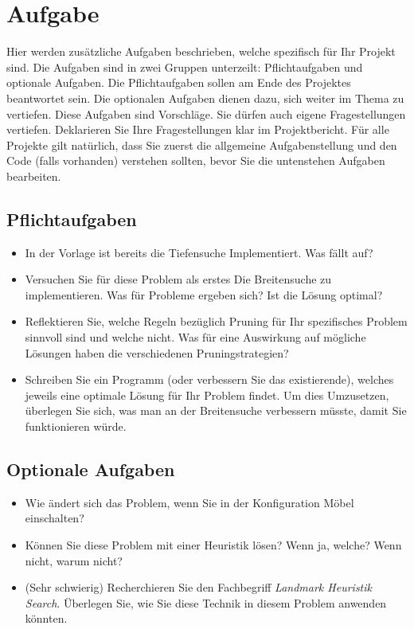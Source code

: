 \documentclass[a4paper,11pt,german,notitlepage]{report}
\begin{document}
\section*{Aufgabe}
Hier werden zusätzliche Aufgaben beschrieben, welche spezifisch für Ihr Projekt sind.
Die Aufgaben sind in zwei Gruppen unterzeilt: Pflichtaufgaben und optionale Aufgaben.
Die Pflichtaufgaben sollen am Ende des Projektes beantwortet sein.
Die optionalen Aufgaben dienen dazu, sich weiter im Thema zu vertiefen.
Diese Aufgaben sind Vorschläge. Sie dürfen auch eigene Fragestellungen vertiefen.
Deklarieren Sie Ihre Fragestellungen klar im Projektbericht.
Für alle Projekte gilt natürlich, dass Sie zuerst die allgemeine Aufgabenstellung und den Code (falls vorhanden) verstehen sollten, bevor Sie die untenstehen Aufgaben bearbeiten.
\subsection*{Pflichtaufgaben}
\begin{itemize}
    \item In der Vorlage ist bereits die Tiefensuche Implementiert. Was fällt auf?
    \item Versuchen Sie für diese Problem als erstes Die Breitensuche zu implementieren. Was für Probleme ergeben sich? Ist die Lösung optimal?
    \item Reflektieren Sie, welche Regeln bezüglich Pruning für Ihr spezifisches Problem sinnvoll sind und welche nicht. Was für eine Auswirkung auf mögliche Lösungen haben die verschiedenen Pruningstrategien?
    \item Schreiben Sie ein Programm (oder verbessern Sie das existierende), welches jeweils eine optimale Lösung für Ihr Problem findet. Um dies Umzusetzen, überlegen Sie sich, was man an der Breitensuche verbessern müsste, damit Sie funktionieren würde.
\end{itemize}
\subsection*{Optionale Aufgaben}
\begin{itemize}
    \item Wie ändert sich das Problem, wenn Sie in der Konfiguration Möbel einschalten?
    \item Können Sie diese Problem mit einer Heuristik lösen? Wenn ja, welche? Wenn nicht, warum nicht?
    \item (Sehr schwierig) Recherchieren Sie den Fachbegriff \textit{Landmark Heuristik Search}. Überlegen Sie, wie Sie diese Technik in diesem Problem anwenden könnten.
\end{itemize}
\end{document}
